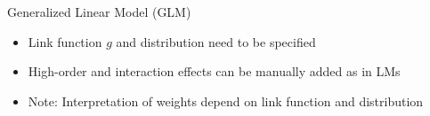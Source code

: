 \documentclass[11pt,compress,t,notes=noshow, aspectratio=169, xcolor=table]{beamer}
\begin{document}
\begin{frame}{Generalized Linear Model (GLM) }
\begin{itemize}[<+->]
        \item Link function $g$ and distribution need to be specified 
        \item High-order and interaction effects can be manually added as in LMs
        \item Note: Interpretation of weights depend on link function and distribution
    \end{itemize}
\end{frame}
 	
\end{document}
